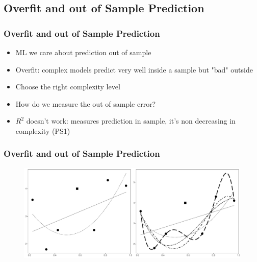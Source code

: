 \documentclass[
  shownotes,
  xcolor={svgnames},
  hyperref={colorlinks,citecolor=DarkBlue,linkcolor=DarkRed,urlcolor=DarkBlue}
  ]{beamer}
\begin{document}
\subsection{Overfit and out of Sample Prediction}
\begin{frame}[fragile]
\frametitle{Overfit and out of Sample Prediction}


\begin{itemize}
  \item ML we care about prediction out of sample
  \medskip
  \item Overfit: complex models predict very well inside a sample but "bad" outside
  \medskip
  \item Choose the right complexity level
  \medskip
  \item How do we measure the out of sample error?
  \medskip
  \item $R^2$ doesn't work: measures prediction in sample, it's non decreasing in complexity (PS1)
\end{itemize}

\end{frame}
\begin{frame}[fragile]
\frametitle{Overfit and out of Sample Prediction}


        \begin{figure}[H] \centering
            \captionsetup{justification=centering}
              \includegraphics[scale=0.4]{figures/fig_1b.pdf}
 \end{figure}

\end{frame}
\end{document}

